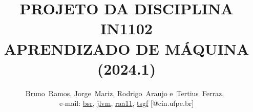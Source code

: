 \documentclass[journal]{IEEEtran}
\begin{document}
%
\title{PROJETO DA DISCIPLINA IN1102\\APRENDIZADO DE MÁQUINA (2024.1)}
%
%
%

\author{Bruno~Ramos,
	Jorge~Mariz,
	Rodrigo~Araujo
	e~Tertius~Ferraz,~%

	e-mail: \href{mailto:bsr@cin.ufpe.br}{bsr}, \href{mailto:jlvm@cin.ufpe.br}{jlvm}, \href{mailto:raa11@cin.ufpe.br}{raa11}, \href{mailto:tsgf@cin.ufpe.br}{tsgf} [@cin.ufpe.br]}%

% 
%
\end{document}
